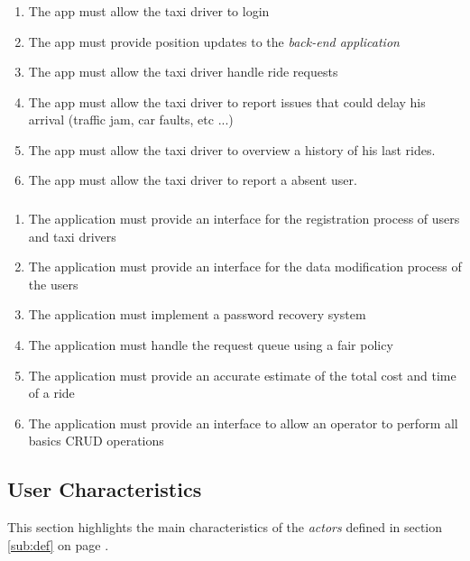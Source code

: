 \subsubsection{} 
\label{ssub:mobile_application_driver}
\begin{enumerate} [resume*]
	\item The app must allow the taxi driver to login
	\item  The app must provide position updates to the \emph{back-end application}
	\item  The app must allow the taxi driver handle ride requests
	\item  The app must allow the taxi driver to report issues that could delay his arrival (traffic jam, car faults, etc ...)
	\item  The app must allow the taxi driver to overview a history of his last rides.
	\item  The app must allow the taxi driver to report a absent user.
\end{enumerate}

\subsubsection{} 
\label{ssub:back_end_application}
\begin{enumerate} [resume*]

	\item  The application must provide an interface for the registration process of users and taxi drivers
	\item The application must provide an interface for the data modification process of the users
	\item The application must implement a password recovery system
	\item  The application must handle the request queue using a fair policy 
	\item  The application must provide an accurate estimate of the total cost and time of a ride
	\item  The application must provide an interface to allow an operator to perform all basics CRUD operations

\end{enumerate}

\subsection{User Characteristics} 
\label{sub:user_characteristics}
This section highlights the main characteristics of the  \emph{actors} defined in section \ref{sub:def} on page \pageref{sub:def}.

